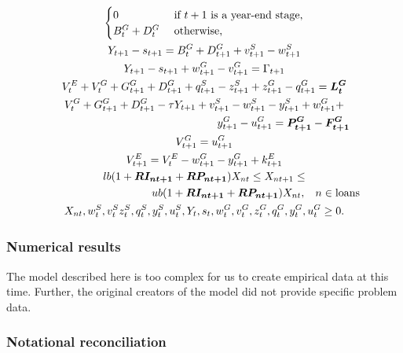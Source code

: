 {\begin{gather}
\begin{cases}
	0 & \text{ if $t+1$ is a year-end stage,} \label{RY:eliminate}\\
	B^G_t + D^G_t & \text{ otherwise,}
\end{cases}\\
Y_{t+1} - s_{t+1} = B^G_t + D^G_{t+1} + v^S_{t+1} - w^S_{t+1}\notag\\
Y_{t+1} - s_{t+1} + w^G_{t+1} - v^G_{t+1} = \Gamma_{t+1}\notag\\
V^E_t + V^G_t + G^G_{t+1} + D^G_{t+1} + q^S_{t+1} - z^S_{t+1} + z^G_{t+1} - q^G_{t+1} = \mathbf{\boldsymbol{L^G_t}}\notag\\
V^G_t + G^G_{t+1} + D^G_{t+1} - \tau Y_{t+1} + v^S_{t+1} - w^S_{t+1} - y^S_{t+1} + w^G_{t+1} +\notag\\
\hspace{2in} y^G_{t+1} - u^G_{t+1} =\mathbf{\boldsymbol{P^G_{t+1}}} - \mathbf{\boldsymbol{F^G_{t+1}}} \label{RY:gg}\\
V^G_{t+1} = u^G_{t+1} \label{RY:vg}\\
V^E_{t+1} = V^E_t - w^G_{t+1} - y^G_{t+1} + k^E_{t+1}\notag\\
lb(1+\mathbf{\boldsymbol{RI_{nt+1}}} + \mathbf{\boldsymbol{RP_{nt+1}}})X_{nt} \leq X_{nt+1} \leq\notag\\
\hspace{1.3in} ub(1+\mathbf{\boldsymbol{RI_{nt+1}}} + \mathbf{\boldsymbol{RP_{nt+1}}})X_{nt}, \hspace{3mm} n \in \mbox{loans} \label{RY:loanconst}\\
X_{nt}, w^S_t, v^S_t z^S_t, q^S_t, y^S_t, u^S_t, Y_t, s_t, w^G_t, v^G_t, z^G_t, q^G_t, y^G_t, u^G_t \geq 0.\notag
\end{gather}
}

\subsubsection{Numerical results}

The model described here is too complex for us to create empirical data at this time.  Further, the original creators of the model \cite{carino98,carino298} did not provide specific problem data.


\subsubsection{Notational reconciliation}

